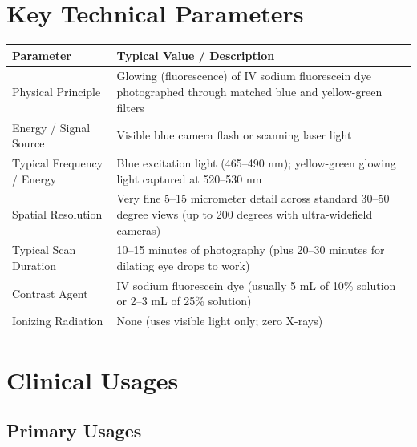 \section{Key Technical Parameters}

\noindent\begin{tabularx}{\textwidth}{@{}l X@{}}
\toprule
\textbf{Parameter} & \textbf{Typical Value / Description} \\
\midrule
Physical Principle & Glowing (fluorescence) of IV sodium fluorescein dye photographed through matched blue and yellow-green filters \\
Energy / Signal Source & Visible blue camera flash or scanning laser light \\
Typical Frequency / Energy & Blue excitation light (465--490 nm); yellow-green glowing light captured at 520--530 nm \\
Spatial Resolution & Very fine 5--15 micrometer detail across standard 30--50 degree views (up to 200 degrees with ultra-widefield cameras) \\
Typical Scan Duration & 10--15 minutes of photography (plus 20--30 minutes for dilating eye drops to work) \\
Contrast Agent & IV sodium fluorescein dye (usually 5 mL of 10\% solution or 2--3 mL of 25\% solution) \\
Ionizing Radiation & None (uses visible light only; zero X-rays) \\
\bottomrule
\end{tabularx}

\section{Clinical Usages}

\subsection{Primary Usages}

